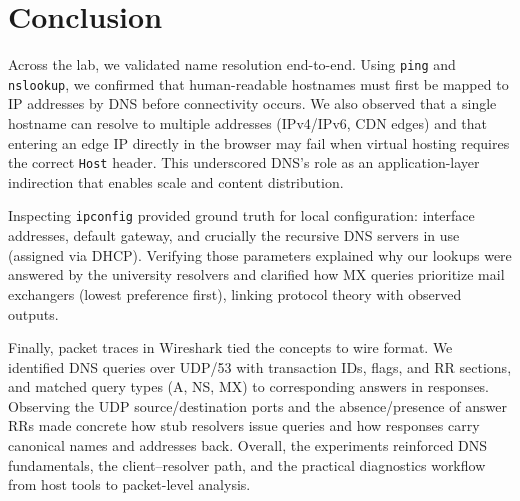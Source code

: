 
\section*{Conclusion}
Across the lab, we validated name resolution end-to-end. Using \texttt{ping} and \texttt{nslookup}, we confirmed that human-readable hostnames must first be mapped to IP addresses by DNS before connectivity occurs. We also observed that a single hostname can resolve to multiple addresses (IPv4/IPv6, CDN edges) and that entering an edge IP directly in the browser may fail when virtual hosting requires the correct \texttt{Host} header. This underscored DNS’s role as an application-layer indirection that enables scale and content distribution.

Inspecting \texttt{ipconfig} provided ground truth for local configuration: interface addresses, default gateway, and crucially the recursive DNS servers in use (assigned via DHCP). Verifying those parameters explained why our lookups were answered by the university resolvers and clarified how MX queries prioritize mail exchangers (lowest preference first), linking protocol theory with observed outputs.

Finally, packet traces in Wireshark tied the concepts to wire format. We identified DNS queries over UDP/53 with transaction IDs, flags, and RR sections, and matched query types (A, NS, MX) to corresponding answers in responses. Observing the UDP source/destination ports and the absence/presence of answer RRs made concrete how stub resolvers issue queries and how responses carry canonical names and addresses back. Overall, the experiments reinforced DNS fundamentals, the client–resolver path, and the practical diagnostics workflow from host tools to packet-level analysis.



%
